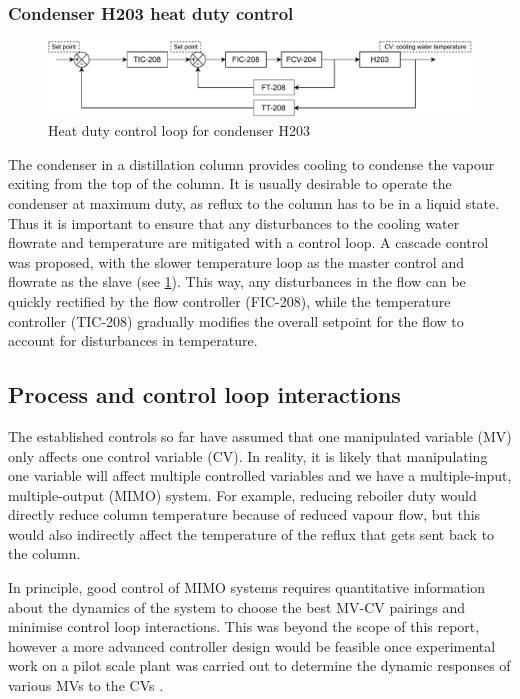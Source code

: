 \subsubsection{Condenser H203 heat duty control}%
    \begin{figure}
        \centering
        \includegraphics[width=\linewidth]{chapters/4-operation-control/4-Figures/H203-TC.pdf}
        \caption{Heat duty control loop for condenser H203}
        \label{fig:S203C-TC}
    \end{figure}
The condenser in a distillation column provides cooling to condense the vapour exiting from the top of the column. It is usually desirable to operate the condenser at maximum duty, as reflux to the column has to be in a liquid state. Thus it is important to ensure that any disturbances to the cooling water flowrate and temperature are mitigated with a control loop. A cascade control was proposed, with the slower temperature loop as the master control and flowrate as the slave (see \cref{fig:S203C-TC}). This way, any disturbances in the flow can be quickly rectified by the flow controller (FIC-208), while the temperature controller (TIC-208) gradually modifies the overall setpoint for the flow to account for disturbances in temperature.

\subsection{Process and control loop interactions}
The established controls so far have assumed that one manipulated variable (MV) only affects one control variable (CV). In reality, it is likely that manipulating one variable will affect multiple controlled variables and we have a multiple-input, multiple-output (MIMO) system. For example, reducing reboiler duty would directly reduce column temperature because of reduced vapour flow, but this would also indirectly affect the temperature of the reflux that gets sent back to the column. 

In principle, good control of MIMO systems requires quantitative information about the dynamics of the system to choose the best MV-CV pairings and minimise control loop interactions. This was beyond the scope of this report, however a more advanced controller design would be feasible once experimental work on a pilot scale plant was carried out to determine the dynamic responses of various MVs to the CVs \cite{seborg_process_2011}.

